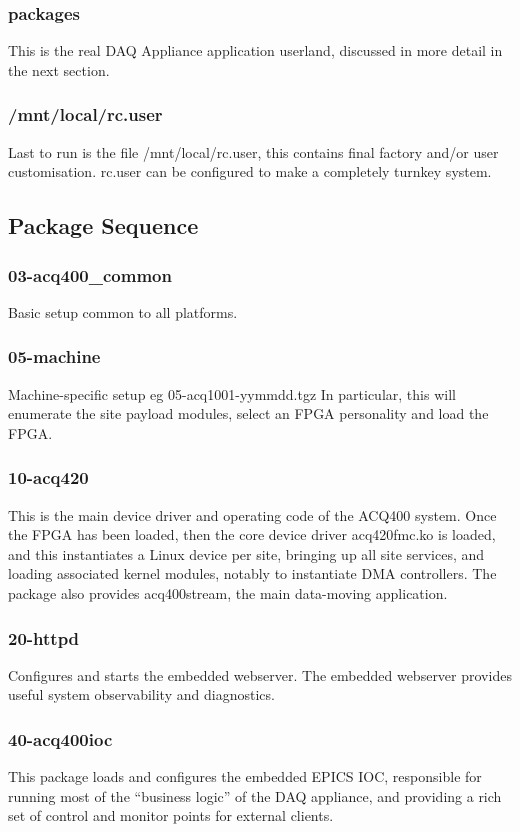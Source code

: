 \documentclass[]{article}
\begin{document}
\subsubsection{packages}
This is the real DAQ Appliance application userland, discussed in more detail in the next section.

\subsubsection{/mnt/local/rc.user}
Last to run is the file /mnt/local/rc.user, this contains final factory and/or user customisation. rc.user can be configured to make a completely turnkey system.

\subsection{Package Sequence}


\subsubsection{03-acq400_common}
Basic setup common to all platforms.

\subsubsection{05-machine}
Machine-specific setup eg 05-acq1001-yymmdd.tgz
In particular, this will enumerate the site payload modules, select an FPGA personality and load the FPGA.

\subsubsection{10-acq420}
This is the main device driver and operating code of the ACQ400 system.
Once the FPGA has been loaded, then the core device driver acq420fmc.ko is loaded, and this instantiates a Linux device per site, bringing up all site services, and loading associated kernel modules, notably to instantiate DMA controllers. The package also provides acq400stream, the main data-moving application.

\subsubsection{20-httpd}
Configures and starts the embedded webserver. The embedded webserver provides useful system observability and diagnostics.

\subsubsection{40-acq400ioc}
This package loads and configures the embedded EPICS IOC, responsible for running most of the “business logic” of the DAQ appliance, and providing a rich set of control and monitor points for external clients.
\end{document}
